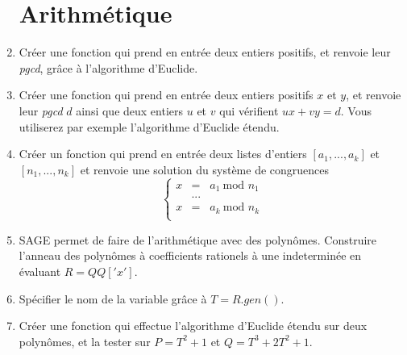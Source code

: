 \begin{enumerate}
\section{Arithmétique}
\item Créer une fonction qui prend en entrée deux entiers positifs, et renvoie leur \textit{pgcd}, grâce à l'algorithme d'Euclide.
\item Créer une fonction qui prend en entrée deux entiers positifs $x$ et $y$, et renvoie leur \textit{pgcd} $d$ ainsi que deux entiers $u$ et $v$ qui vérifient $ux+vy=d$. Vous utiliserez par exemple l'algorithme d'Euclide étendu.
\item Créer un fonction qui prend en entrée deux listes d'entiers $[a_1,...,a_k]$ et $[n_1,...,n_k]$ et renvoie une solution du système de congruences
\[\left\{\begin{array}{rcl}
 x & = & a_1 \ \text{mod }n_1\\
   &  ... & \\
 x & = & a_k \ \text{mod }n_k\\
\end{array}\right.\]
\item SAGE permet de faire de l'arithmétique avec des polynômes. Construire l'anneau des polynômes à coefficients rationels à une indeterminée en évaluant $R=QQ['x']$. 
\item Spécifier le nom de la variable grâce à $T=R.gen()$.
\item Créer une fonction qui effectue l'algorithme d'Euclide étendu sur deux polynômes, et la tester sur $P=T^2+1$ et $Q=T^3+2T^2+1$.

\end{enumerate}